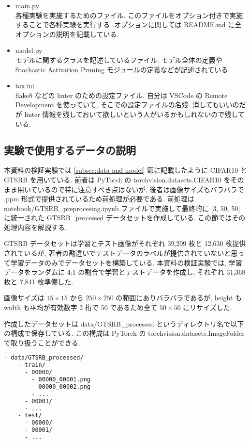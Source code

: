 \begin{itemize}
  \item main.py\\
  各種実験を実施するためのファイル.
  このファイルをオプション付きで実施することで各種実験を実行する.
  オプションに関しては README.md に全オプションの説明を記載している.
  \item model.py\\
  モデルに関するクラスを記述しているファイル.
  モデル全体の定義や Stochastic Activation Pruning モジュールの定義などが記述されている.
  \item tox.ini\\
  flake8 などの linter のための設定ファイル.
  自分は VSCode の Remote Development を使っていて, そこでの設定ファイルの名残.
  消してもいいのだが linter 情報を残しておいて欲しいという人がいるかもしれないので残している.
\end{itemize}
%



\subsection{実験で使用するデータの説明}
\label{subsec:appendix-data}
本資料の検証実験では \ref{subsec:data-and-model} 節に記載したように CIFAR10 と GTSRB を用いている.
前者は PyTorch の torchvision.datasets.CIFAR10 をそのまま用いているので特に注意すべき点はないが, 後者は画像サイズもバラバラで .ppm 形式で提供されているため前処理が必要である.
前処理は notebook/GTSRB\_preprocesing.ipynb ファイルで実施して最終的に [3, 50, 50] に統一された GTSRB\_processed データセットを作成している.
この節ではその処理内容を解説する.

GTSRB データセットは学習とテスト画像がそれぞれ 39,209 枚と 12,630 枚提供されているが, 著者の勘違いでテストデータのラベルが提供されていないと思って学習データのみでデータセットを構築している.
本資料の検証実験では, 学習データをランダムに 4:1 の割合で学習とテストデータを作成し, それぞれ 31,368 枚と 7,841 枚準備した.

画像サイズは $15 \times 15$ から $250 \times 250$ の範囲にありバラバラであるが, height も width も平均が有効数字 2 桁で 50 であるため全て $50 \times 50$ にリサイズした.

作成したデータセットは data/GTSRB\_processed というディレクトリ名で以下の構成で保存している.
この構成は PyTorch の torchvision.datasets.ImageFolder で取り扱うことができる.
%
\begin{lstlisting}[language=bash]
  - data/GTSRB_processed/
    - train/
      - 00000/
        - 00000_00001.png
        - 00000_00002.png
        - ...
      - 00001/
      - ...
    - test/
      - 00000/
      - 00001/
      - ...
\end{lstlisting}
%

